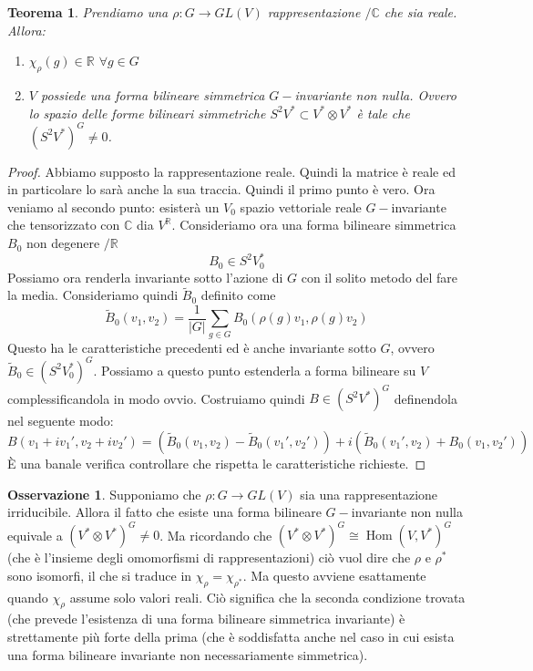 \documentclass[11pt]{article}
\theoremstyle{plain}
\newtheorem{thm}{Teorema}[section]
\theoremstyle{definition}
\newtheorem*{rem}{Osservazione}
\theoremstyle{remark}
\newcommand{\C}{\mathbb{C}}
\newcommand{\R}{\mathbb{R}}
\newcommand{\dsum}{\displaystyle\sum}
\DeclareMathOperator{\Hom}{Hom}
\begin{document}
\begin{thm}
Prendiamo una $\rho:G\to GL(V)$ rappresentazione $/\C$ che sia reale. Allora:
\begin{enumerate}
\item $\chi_\rho(g)\in \R$ $\forall g\in G$
\item $V$ possiede una forma bilineare simmetrica $G-$invariante non nulla. Ovvero lo spazio delle forme bilineari simmetriche $S^2V^*\subset V^*\otimes V^*$ è tale che $(S^2V^*)^G\neq 0$.
\end{enumerate}
\end{thm}

\begin{proof}
Abbiamo supposto la rappresentazione reale. Quindi la matrice è reale ed in particolare lo sarà anche la sua traccia. Quindi il primo punto è vero. Ora veniamo al secondo punto: esisterà un $V_0$ spazio vettoriale reale $G-$invariante che tensorizzato con $\C$ dia $V^\R$. Consideriamo ora una forma bilineare simmetrica $B_0$ non degenere $/\R$
\[ B_0 \in S^2 V_0^*\]
Possiamo ora renderla invariante sotto l'azione di $G$ con il solito metodo del fare la media. Consideriamo quindi $\tilde B_0$ definito come
\[ \tilde B_0(v_1, v_2) = \dfrac{1}{|G|} \dsum_{g\in G} B_0(\rho(g) v_1, \rho(g) v_2)\]
Questo ha le caratteristiche precedenti ed è anche invariante sotto $G$, ovvero $\tilde B_0\in (S^2V_0^*)^G$. Possiamo a questo punto estenderla a forma bilineare su $V$ complessificandola in modo ovvio. Costruiamo quindi $B \in (S^2V^*)^G$ definendola nel seguente modo:
\[B(v_1 + i v_1', v_2 + i v_2') = \left( \tilde B_0(v_1, v_2) - \tilde B_0(v_1', v_2')\right)  + i \left( \tilde B_0(v_1', v_2) + B_0(v_1, v_2')\right)\]
\`E una banale verifica controllare che rispetta le caratteristiche richieste.
\end{proof}

\begin{rem}
Supponiamo che $\rho:G\to GL(V)$ sia una rappresentazione irriducibile. Allora il fatto che esiste una forma bilineare $G-$invariante non nulla
equivale a $(V^*\otimes V^*)^G\neq 0$. Ma ricordando che $(V^*\otimes V^*)^G \cong \Hom(V,V^*)^G$ (che è l'insieme degli omomorfismi di rappresentazioni) ciò vuol dire che $\rho$ e $\rho^*$ sono isomorfi, il che si traduce in $\chi_\rho = \chi_{\rho^*}$. Ma questo avviene esattamente quando $\chi_\rho$ assume solo valori reali. Ciò significa che la seconda condizione trovata (che prevede l'esistenza di una forma bilineare simmetrica invariante) è strettamente più forte della prima (che è soddisfatta anche nel caso in cui esista una forma bilineare invariante non necessariamente simmetrica).
\end{rem}
\end{document}
